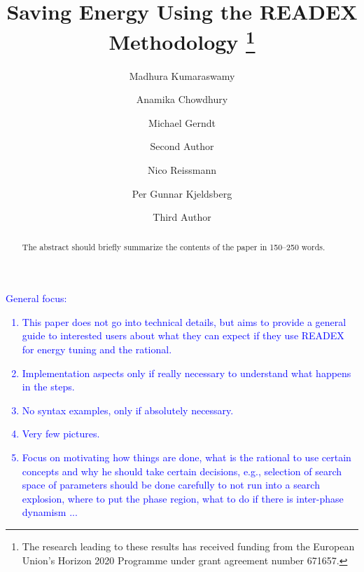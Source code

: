 \documentclass[runningheads]{llncs}
\begin{document}
%
\title{Saving Energy Using the READEX Methodology \thanks{The research leading to these results has received funding from the European Union's Horizon 2020 Programme under grant agreement number 671657.}}
%
%
\author{Madhura Kumaraswamy \and Anamika Chowdhury \and Michael Gerndt  \and
Second Author \and
Nico Reissmann  \and Per Gunnar Kjeldsberg  \and
Third Author}
%
%

\maketitle              %

\begin{abstract}
The abstract should briefly summarize the contents of the paper in
150--250 words.

\end{abstract}

\textcolor{blue}{General focus:
\begin{enumerate}
  \item This paper does not go into technical details, but aims to provide a general guide to interested users about what they can expect if they use READEX for energy tuning and the rational.
  \item Implementation aspects only if really necessary to understand what happens in the steps.
  \item No syntax examples, only if absolutely necessary.
  \item Very few pictures.
  \item Focus on motivating how things are done, what is the rational to use certain concepts and why he should take certain decisions, e.g., selection of search space of parameters should be done carefully to not run into a search explosion, where to put the phase region, what to do if there is inter-phase dynamism ...
\end{enumerate}
}
\end{document}
